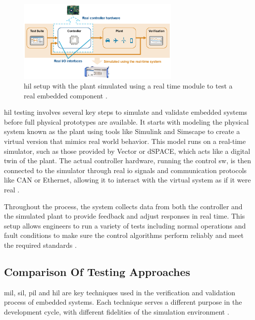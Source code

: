 \begin{figure}[!ht]
    \centering
    \includegraphics[width=0.7\textwidth]{Figures/HiL_test_setup.png}  %
    \caption{\gls{hil} setup with the plant simulated using a real time module to test a real embedded component \cite{V_model}.}
    \label{HiL_Setup}
\end{figure}

\gls{hil} testing involves several key steps to simulate and validate embedded systems before full physical prototypes are available. It starts with modeling the physical system known as the plant using tools like Simulink and Simscape to create a virtual version that mimics real world behavior. This model runs on a real-time simulator, such as those provided by Vector or dSPACE, which acts like a digital twin of the plant. The actual controller hardware, running the control \gls{sw}, is then connected to the simulator through real \gls{io} signals and communication protocols like CAN or Ethernet, allowing it to interact with the virtual system as if it were real \cite{HiL_Testing}.

Throughout the process, the system collects data from both the controller and the simulated plant to provide feedback and adjust responses in real time. This setup allows engineers to run a variety of tests including normal operations and fault conditions to make sure the control algorithms perform reliably and meet the required standards \cite{HiL_Testing}.

\subsection{Comparison Of Testing Approaches}
\gls{mil}, \gls{sil}, \gls{pil} and \gls{hil} are key techniques used in the verification and validation process of embedded systems. Each technique serves a different purpose in the development cycle, with different fidelities of the simulation environment \cite{HiL_Testing}.

